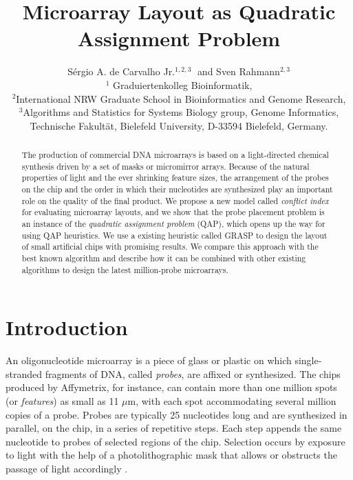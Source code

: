 \documentclass[english]{lni}
\begin{document}
\title{Microarray Layout as Quadratic Assignment Problem}
\author{S\'ergio A. de Carvalho Jr.${}^{1,2,3}$
$\;$and
Sven Rahmann${}^{2,3}$\\[1ex]
${}^1$ Graduiertenkolleg Bioinformatik,\\
${}^2$International NRW Graduate School in Bioinformatics and Genome Research,\\
${}^3$Algorithms and Statistics for Systems Biology group, Genome Informatics,\\
Technische Fakult\"at, Bielefeld University, D-33594 Bielefeld, Germany.
}

\maketitle

\begin{abstract}
The production of commercial DNA microarrays is based on a
light-directed chemical synthesis driven by a set of masks or
micromirror arrays. Because of the natural properties of light and the
ever shrinking feature sizes, the arrangement of the probes on the
chip and the order in which their nucleotides are synthesized play an
important role on the quality of the final product.
We propose a new model called \emph{conflict index} for evaluating
microarray layouts, and we show that the probe placement problem is an
instance of the \emph{quadratic assignment problem} (QAP), which opens
up the way for using QAP heuristics. We use a existing heuristic
called GRASP to design the layout of small artificial chips with
promising results. We compare this approach with the best known
algorithm and describe how it can be combined with other existing
algorithms to design the latest million-probe microarrays.

\end{abstract}

\section{Introduction}

An oligonucleotide microarray is a piece of glass or plastic on which
single-stranded fragments of DNA, called \emph{probes}, are affixed or
synthesized. The chips produced by Affymetrix, for instance, can contain more
than one million spots (or \emph{features}) as small as 11 $\mu$m, with each
spot accommodating several million copies of a probe. Probes are typically 25
nucleotides long and are synthesized in parallel, on the chip, in a series of
repetitive steps. Each step appends the same nucleotide to probes of selected
regions of the chip. Selection occurs by exposure to light with the help of a
photolithographic mask that allows or obstructs the passage of light
accordingly \cite{FODOR91}.
\end{document}
